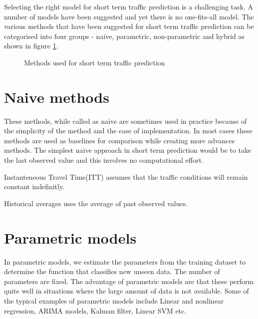 Selecting the right model for short term traffic prediction is a challenging task. A number of
models have been suggested and yet there is no one-fits-all model. The various methods that have
been suggested for short term traffic prediction can be categorised into four groups -
naive, parametric, non-parametric and hybrid as shown in figure \ref{fig:taxonomyTrafficPrediction}.


\begin{figure}
\centering
{}
\caption{Methods used for short term traffic prediction} \label{fig:taxonomyTrafficPrediction}
\end{figure}

\section{Naive methods}
These methods, while called as naive are  sometimes used in practice because of the simplicity
of the method and the ease of implementation. In most cases these methods are used as baselines
for comparison while creating more advances methods. The simplest naive approach in short term
prediction would be to take the last observed value and this involves no computational effort.

Instanteneous Travel Time(ITT) assumes that the traffic conditions will remain constant indefinitly.

Historical averages uses the average of past observed values.

\section{Parametric models}
In parametric models, we estimate the parameters from the training dataset to determine the
function that classifies new unseen data. The number of parameters are fixed. The advantage of
parametric models are that these perform quite well in situations where the large amount of data
is not available. Some of the typical examples of parametric models include Linear and
nonlinear regression, ARIMA models, Kalman filter, Linear SVM etc.

